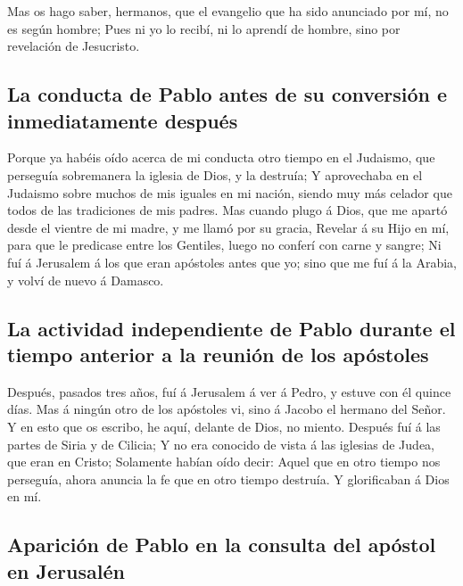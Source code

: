  Mas os hago saber, hermanos, que el evangelio que ha sido
anunciado por mí, no es según hombre;  Pues ni yo lo
recibí, ni lo aprendí de hombre, sino por revelación de Jesucristo.

\hypertarget{la-conducta-de-pablo-antes-de-su-conversiuxf3n-e-inmediatamente-despuuxe9s}{%
\subsection{La conducta de Pablo antes de su conversión e inmediatamente
después}\label{la-conducta-de-pablo-antes-de-su-conversiuxf3n-e-inmediatamente-despuuxe9s}}

 Porque ya habéis oído acerca de mi conducta otro tiempo en
el Judaismo, que perseguía sobremanera la iglesia de Dios, y la
destruía;  Y aprovechaba en el Judaismo sobre muchos de mis
iguales en mi nación, siendo muy más celador que todos de las
tradiciones de mis padres.  Mas cuando plugo á Dios, que me
apartó desde el vientre de mi madre, y me llamó por su gracia,
 Revelar á su Hijo en mí, para que le predicase entre los
Gentiles, luego no conferí con carne y sangre;  Ni fuí á
Jerusalem á los que eran apóstoles antes que yo; sino que me fuí á la
Arabia, y volví de nuevo á Damasco.

\hypertarget{la-actividad-independiente-de-pablo-durante-el-tiempo-anterior-a-la-reuniuxf3n-de-los-apuxf3stoles}{%
\subsection{La actividad independiente de Pablo durante el tiempo
anterior a la reunión de los
apóstoles}\label{la-actividad-independiente-de-pablo-durante-el-tiempo-anterior-a-la-reuniuxf3n-de-los-apuxf3stoles}}

 Después, pasados tres años, fuí á Jerusalem á ver á Pedro,
y estuve con él quince días.  Mas á ningún otro de los
apóstoles vi, sino á Jacobo el hermano del Señor.  Y en
esto que os escribo, he aquí, delante de Dios, no miento. 
Después fuí á las partes de Siria y de Cilicia;  Y no era
conocido de vista á las iglesias de Judea, que eran en Cristo;
 Solamente habían oído decir: Aquel que en otro tiempo nos
perseguía, ahora anuncia la fe que en otro tiempo destruía.
 Y glorificaban á Dios en mí.

\hypertarget{apariciuxf3n-de-pablo-en-la-consulta-del-apuxf3stol-en-jerusaluxe9n}{%
\subsection{Aparición de Pablo en la consulta del apóstol en
Jerusalén}\label{apariciuxf3n-de-pablo-en-la-consulta-del-apuxf3stol-en-jerusaluxe9n}}

